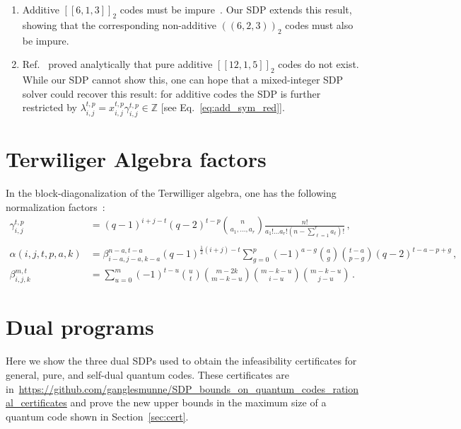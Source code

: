 \documentclass[12pt,a4paper]{amsart}
\newcommand{\nn}{\nonumber}
\begin{document}
\begin{enumerate}
\item[(e)]
Additive $[\![6,1,3]\!]_2$ codes must be impure~\cite{681315}.
Our SDP extends this result, showing that the corresponding non-additive $(\!(6,2,3)\!)_2$ codes must also be impure.

\item[(f)] Ref.~\cite{681315} proved analytically that pure additive $[\![12,1,5]\!]_2$ codes do not exist.
% 
While our SDP cannot show this,
one can hope that a mixed-integer SDP solver could recover this result:
% 
for additive codes the SDP is further restricted by $\lambda^{t,p}_{i,j} = x^{t,p}_{i,j}\gamma^{t,p}_{i,j}\in \mathbb{Z}$ [see Eq.~\eqref{eq:add_sym_red}].
\end{enumerate}





\appendix
\section{Terwiliger Algebra factors}\label{app:Terw}

In the block-diagonalization of the Terwilliger algebra, one has the following normalization factors~\cite{GIJSWIJT20061719}:
%
\begin{align}\label{eq:gamma}
	\gamma_{i,j}^{t,p}
	&= (q-1)^{i+j-t}(q-2)^{t-p}\binom{n}{a_1,\dots,a_r}\frac{n!}{a_1!\dots a_r!(n-\sum^r_{\ell=1} a_\ell)!}\,, 
    \\\nn\\\nn
%
	\alpha(i,j,t,p,a,k) &= \beta_{i-a,j-a,k-a}^{n-a,t-a}\left(q-1\right)^{\frac{1}{2}\left(i+j\right)-t} \sum\limits_{g=0}^{p}\left(-1\right)^{a-g}\binom{a}{g}\binom{t-a}{p-g}\left(q-2\right)^{t-a-p+g}\,,\label{eq:alpha}\\
	\beta_{i,j,k}^{m,t}&=\sum\limits_{u=0}^{m}\left(-1\right)^{t-u}\binom{u}{t}\binom{m-2k}{m-k-u}\binom{m-k-u}{i-u}\binom{m-k-u}{j-u}\,.
\end{align}

\section{Dual programs}\label{app:dual}

Here we show the three dual SDPs used to obtain the infeasibility certificates for general, pure, and self-dual quantum codes.
% 
These certificates are in~\url{https://github.com/ganglesmunne/SDP_bounds_on_quantum_codes_rational_certificates} and prove the new upper bounds in the maximum size of a quantum code shown in Section~\ref{sec:cert}.
% 
\end{document}
